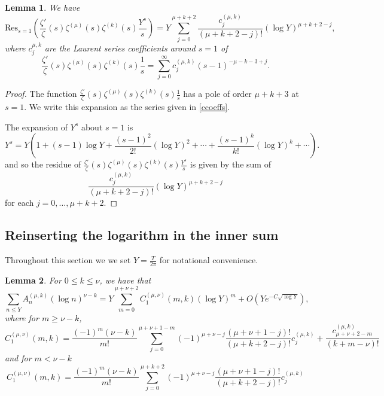 \documentclass[12pt, a4paper,reqno]{amsart}
\newtheorem{lemma}{Lemma}
\theoremstyle{definition}
\numberwithin{equation}{section}
\begin{document}
\begin{lemma}\label{bccoeffs}
    We have \begin{equation}\label{bccoeffs_eq}
        \mathrm{Res}_{s=1}\left(\frac{\zeta'}{\zeta}(s)\zeta^{(\mu)}(s)\zeta^{(k)}(s)\frac{Y^s}{s}\right)=Y\sum_{j=0}^{\mu+k+2}\frac{c^{(\mu,k)}_{j}}{(\mu+k+2-j)!}(\log Y)^{\mu+k+2-j},
    \end{equation}
     where $c^{\mu,k}_{j}$ are the Laurent series coefficients around $s=1$ of \begin{equation}\label{ccoeffs}
    \frac{\zeta'}{\zeta}(s)\zeta^{(\mu)}(s)\zeta^{(k)}(s)\frac{1}{s}=\sum_{j=0}^{\infty}c^{(\mu,k)}_{j}(s-1)^{-\mu-k-3+j}.
\end{equation}
\end{lemma}
\begin{proof}
The function $\frac{\zeta'}{\zeta}(s)\zeta^{(\mu)}(s)\zeta^{(k)}(s)\frac{1}{s}$ has a pole of order $\mu+k+3$ at $s=1$. We write this expansion as the series given in \eqref{ccoeffs}.

The expansion of $Y^s$ about $s=1$ is 
\begin{equation*}
    Y^s=Y\left(1+(s-1)\log Y+\frac{(s-1)^2}{2!}(\log Y)^2+\cdots+\frac{(s-1)^k}{k!}(\log Y)^k+\cdots\right).
\end{equation*}
and so the residue of $\frac{\zeta'}{\zeta}(s)\zeta^{(\mu)}(s)\zeta^{(k)}(s)\frac{Y^s}{s}$ is given by the sum of 
\begin{equation*}
    \frac{c^{(\mu,k)}_{j}}{(\mu+k+2-j)!} (\log Y)^{\mu+k+2-j}
\end{equation*}
for each $j=0,\dots,\mu+k+2$.
\end{proof}

\subsection{Reinserting the logarithm in the inner sum}\label{subsection:logarithm_inner_sum} \hfill

Throughout this section we  we set $Y = \frac{T}{2\pi}$ for notational convenience.

\begin{lemma}\label{lemma_messy_binomial}
    For $0\leq k \leq \nu$, we have that 
    \begin{equation*}
        \sum_{n\le Y}A_n^{(\mu,k)}(\log n)^{\nu-k}=Y\sum_{m=0}^{\mu+\nu+2}C_1^{(\mu,\nu)}(m,k)(\log Y)^m+O\left(Ye^{-C\sqrt{\log Y}}\right),
    \end{equation*}
where for $ m \geq \nu-k$,
\begin{equation*}
C_1^{(\mu,\nu)}(m,k) = \frac{(-1)^m(\nu-k)}{m!}\sum_{j=0}^{\mu+\nu+1-m} (-1)^{\mu+\nu-j} \frac{(\mu+\nu+1-j)! }{(\mu+k+2-j)!} c^{(\mu,k)}_{j} + 
\frac{c^{(\mu,k)}_{\mu+\nu+2-m}}{(k+m-\nu)!}
\end{equation*}
and for $m < \nu-k $
\begin{equation*}
C_1^{(\mu,\nu)}(m,k) = \frac{(-1)^m(\nu-k)}{m!}\sum_{j=0}^{\mu+k+2} (-1)^{\mu+\nu-j} \frac{(\mu+\nu+1-j)! }{(\mu+k+2-j)!} c^{(\mu,k)}_{j} 
\end{equation*}
\end{lemma}
\end{document}

